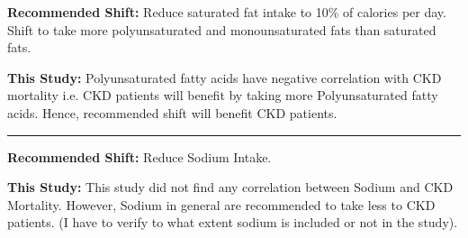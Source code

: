 \noindent \textbf{Recommended Shift:} Reduce saturated fat intake to 10\% of calories per day. Shift to take more  polyunsaturated and monounsaturated fats than saturated fats.

\noindent \textbf{This Study:} Polyunsaturated fatty acids have negative correlation with CKD mortality i.e. CKD patients will benefit by taking more  Polyunsaturated fatty acids. Hence, recommended shift will benefit CKD patients.

\noindent\rule{9cm}{0.4pt}

\noindent \textbf{Recommended Shift:} Reduce Sodium Intake.

\noindent \textbf{This Study:} This study did not find any correlation between Sodium and CKD Mortality. However, Sodium in general are recommended to take less to CKD patients.  (I have to verify to what extent sodium is included or not in the study).